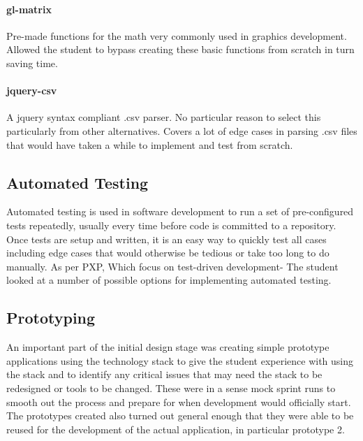 \paragraph{gl-matrix}
Pre-made functions for the math very commonly used in graphics development. Allowed the student to bypass creating these basic functions from scratch in turn saving time.

\paragraph{jquery-csv}
A jquery syntax compliant .csv parser. No particular reason to select this particularly from other alternatives. Covers a lot of edge cases in parsing .csv files that would have taken a while to implement and test from scratch.

\subsection{Automated Testing} \label{automatedtests}
Automated testing is used in software development to run a set of pre-configured tests repeatedly, usually every time before code is committed to a repository. Once tests are setup and written, it is an easy way to quickly test all cases including edge cases that would otherwise be tedious or take too long to do manually. As per PXP, Which focus on test-driven development- The student looked at a number of possible options for implementing automated testing.

\subsection{Prototyping} \label{prototype}
An important part of the initial design stage was creating simple prototype applications using the technology stack to give the student experience with using the stack and to identify any critical issues that may need the stack to be redesigned or tools to be changed. These were in a sense mock sprint runs to smooth out the process and prepare for when development would officially start. The prototypes created also turned out general enough that they were able to be reused for the development of the actual application, in particular prototype 2.

